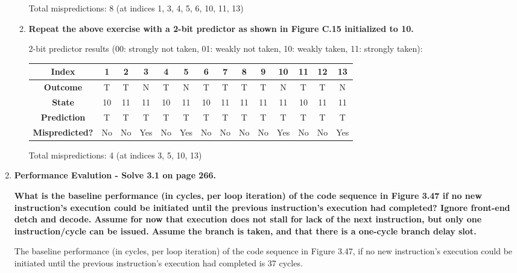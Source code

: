 \begin{enumerate}
\begin{enumerate}
        Total mispredictions: 8 (at indices 1, 3, 4, 5, 6, 10, 11, 13)
        
        \item \textbf{Repeat the above exercise with a 2-bit predictor as shown in Figure C.15 initialized to 10.}
        
        2-bit predictor results (00: strongly not taken, 01: weakly not taken, 10: weakly taken, 11: strongly taken):
        
        \begin{center}
            \begin{tabular}{|c|c|c|c|c|c|c|c|c|c|c|c|c|c|}
                \hline
                \textbf{Index} & 1 & 2 & 3 & 4 & 5 & 6 & 7 & 8 & 9 & 10 & 11 & 12 & 13 \\
                \hline
                \textbf{Outcome} & T & T & N & T & N & T & T & T & T & N & T & T & N \\
                \hline
                \textbf{State} & 10 & 11 & 11 & 10 & 11 & 10 & 11 & 11 & 11 & 11 & 10 & 11 & 11 \\
                \hline
                \textbf{Prediction} & T & T & T & T & T & T & T & T & T & T & T & T & T \\
                \hline
                \textbf{Mispredicted?} & No & No & Yes & No & Yes & No & No & No & No & Yes & No & No & Yes \\
                \hline
            \end{tabular}
        \end{center}
        
        Total mispredictions: 4 (at indices 3, 5, 10, 13)
    \end{enumerate}
    
    \item \textbf{Performance Evalution - Solve 3.1 on page 266.}
    
    \textbf{What is the baseline performance (in cycles, per loop iteration) of the code sequence in Figure 3.47 if no new instruction's execution could be initiated until the previous instruction's execution had completed? Ignore front-end detch and decode. Assume for now that execution does not stall for lack of the next instruction, but only one instruction/cycle can be issued. Assume the branch is taken, and that there is a one-cycle branch delay slot.}
    
    The baseline performance (in cycles, per loop iteration) of the code sequence in Figure 3.47, if no new instruction's execution could be initiated until the previous instruction's execution had completed is 37 cycles. 
    

\end{enumerate}
